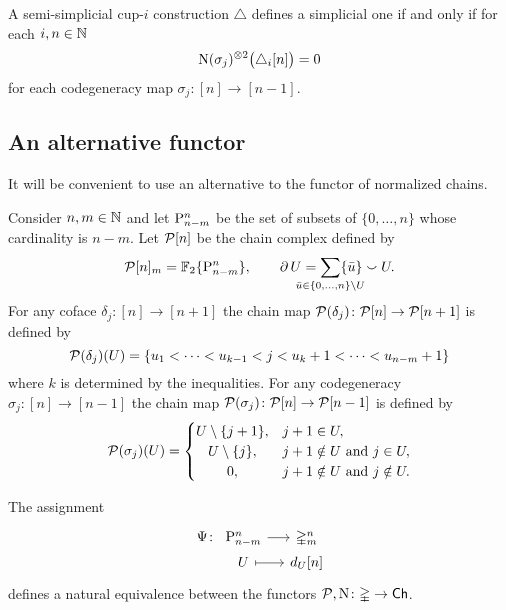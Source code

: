 \begin{lemma}
	A semi-simplicial cup-$i$ construction $\triangle$ defines a simplicial one if and only if for each $i,n\in\N$
	\[
	\chains(\sigma_j)^{\ot 2}\big(\triangle_i[n]\big) = 0
	\]
	for each codegeneracy map $\sigma_j \colon [n] \to [n-1]$.
\end{lemma}

\subsection{An alternative functor}\label{ss:alternative functor}

It will be convenient to use an alternative to the functor of normalized chains.

Consider $n,m \in \N$ and let $\P_{n-m}^n$ be the set of subsets of $\{0, \dots, n\}$ whose cardinality is $n-m$.
Let $\cP[n]$ be the chain complex defined by
\[
\cP[n]_m = \Ftwo\set{\P_{n-m}^n}, \qquad
\bd U = \sum_{\mathclap{\bar u \in \{0, \dots, n\} \setminus U}} \{\bar u\} \union U.
\]
For any coface $\delta_j \colon [n] \to [n+1]$ the chain map $\cP(\delta_j) \colon \cP[n] \to \cP[n+1]$ is defined by
\[
\cP(\delta_j)(U) = \{ u_1 < \dots < u_{k-1} < j < u_k+1 < \dots < u_{n-m}+1 \}
\]
where $k$ is determined by the inequalities.
For any codegeneracy $\sigma_j \colon [n] \to [n-1]$ the chain map $\cP(\sigma_j) \colon \cP[n] \to \cP[n-1]$ is defined by
\[
\cP(\sigma_j)(U) = \begin{cases}
	U \setminus \{j+1\}, & j+1 \in U, \\
	\hfil U \setminus \{j\}, & j+1 \notin U \text{ and } j \in U, \\
	\hfil 0, & j+1 \notin U \text{ and } j \notin U.
\end{cases}
\]

\begin{lemma*}
	The assignment
	\[
	\begin{tikzcd}[column sep=small,row sep=0]
		\Psi \colon &[-15] \P_{n-m}^n \rar & \simplex^n_m \\
		& U \rar[mapsto] & d_U [n]
	\end{tikzcd}
	\]
	defines a natural equivalence between the functors $\cP,\chains \colon \simplex \to \Ch$.
\end{lemma*}

